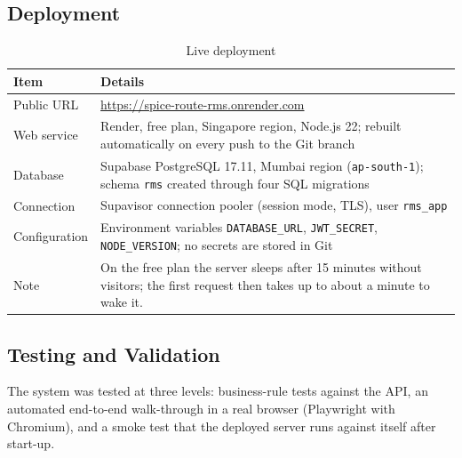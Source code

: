 \documentclass[11pt,a4paper]{report}
\begin{document}
\subsection{Deployment}
\begin{table}[H]
    \centering
    \caption{Live deployment}
    \small
    \begin{tabularx}{\textwidth}{|l|Y|}
        \hline
        \textbf{Item} & \textbf{Details} \\ \hline
        Public URL & \url{https://spice-route-rms.onrender.com} \\ \hline
        Web service & Render, free plan, Singapore region, Node.js 22; rebuilt automatically on every push to the Git branch \\ \hline
        Database & Supabase PostgreSQL 17.11, Mumbai region (\texttt{ap-south-1}); schema \texttt{rms} created through four SQL migrations \\ \hline
        Connection & Supavisor connection pooler (session mode, TLS), user \texttt{rms\_app} \\ \hline
        Configuration & Environment variables \texttt{DATABASE\_URL}, \texttt{JWT\_SECRET}, \texttt{NODE\_VERSION}; no secrets are stored in Git \\ \hline
        Note & On the free plan the server sleeps after 15 minutes without visitors; the first request then takes up to about a minute to wake it. \\ \hline
    \end{tabularx}
\end{table}

\subsection{Testing and Validation}
The system was tested at three levels: business-rule tests against the API, an automated end-to-end walk-through in a real browser (Playwright with Chromium), and a smoke test that the deployed server runs against itself after start-up.
\end{document}
